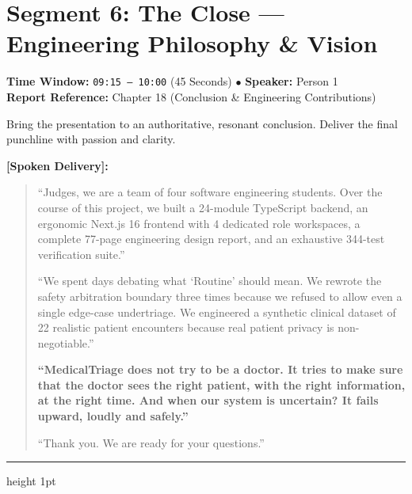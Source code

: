 \documentclass[11pt,a4paper]{article}
\begin{document}
\section{Segment 6: The Close --- Engineering Philosophy \& Vision}
\noindent \textbf{Time Window:} \texttt{09:15 -- 10:00} (45 Seconds) \quad $\bullet$ \quad \textbf{Speaker:} Person 1\\
\textbf{Report Reference:} Chapter 18 (Conclusion \& Engineering Contributions)

\begin{stagenote}
Bring the presentation to an authoritative, resonant conclusion. Deliver the final punchline with passion and clarity.
\end{stagenote}

\vspace{1mm}
\noindent \textbf{[Spoken Delivery]:}
\begin{quote}
``Judges, we are a team of four software engineering students. Over the course of this project, we built a 24-module TypeScript backend, an ergonomic Next.js 16 frontend with 4 dedicated role workspaces, a complete 77-page engineering design report, and an exhaustive 344-test verification suite.''

``We spent days debating what `Routine' should mean. We rewrote the safety arbitration boundary three times because we refused to allow even a single edge-case undertriage. We engineered a synthetic clinical dataset of 22 realistic patient encounters because real patient privacy is non-negotiable.''

\vspace{1em}
\textbf{``MedicalTriage does not try to be a doctor. It tries to make sure that the doctor sees the right patient, with the right information, at the right time. And when our system is uncertain? It fails upward, loudly and safely.''}

\vspace{1em}
``Thank you. We are ready for your questions.''
\end{quote}

\vspace{6mm}
\hrule height 1pt
\vspace{8mm}

\end{document}

